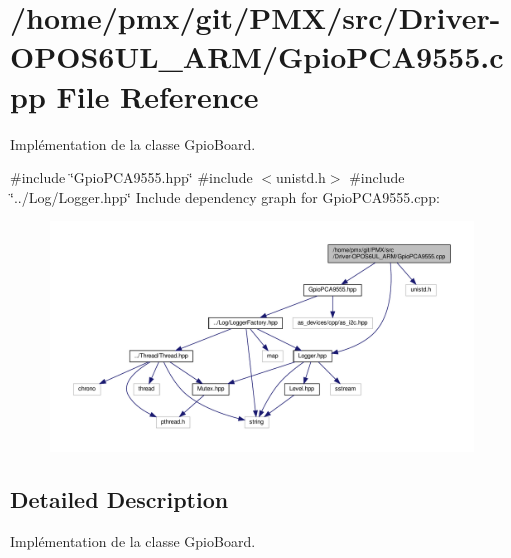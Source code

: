\hypertarget{Driver-OPOS6UL__ARM_2GpioPCA9555_8cpp}{}\section{/home/pmx/git/\+P\+M\+X/src/\+Driver-\/\+O\+P\+O\+S6\+U\+L\+\_\+\+A\+R\+M/\+Gpio\+P\+C\+A9555.cpp File Reference}
\label{Driver-OPOS6UL__ARM_2GpioPCA9555_8cpp}


Implémentation de la classe Gpio\+Board.  


{\ttfamily \#include \char`\"{}Gpio\+P\+C\+A9555.\+hpp\char`\"{}}\newline
{\ttfamily \#include $<$unistd.\+h$>$}\newline
{\ttfamily \#include \char`\"{}../\+Log/\+Logger.\+hpp\char`\"{}}\newline
Include dependency graph for Gpio\+P\+C\+A9555.\+cpp\+:
\nopagebreak
\begin{figure}[H]
\begin{center}
\leavevmode
\includegraphics[width=350pt]{Driver-OPOS6UL__ARM_2GpioPCA9555_8cpp__incl}
\end{center}
\end{figure}


\subsection{Detailed Description}
Implémentation de la classe Gpio\+Board. 

